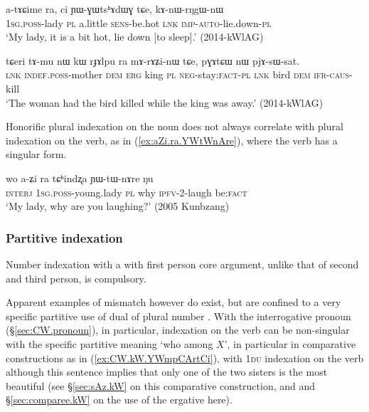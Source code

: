 \begin{exe}
\ex \label{ex:atACime.kAnWrNgWnW}
\gll a-tɤɕime ra, ci ɲɯ-ɣɯtsʰɤdɯɣ tɕe, kɤ-nɯ-rŋgɯ-nɯ \\
\textsc{1sg}.\textsc{poss}-lady \textsc{pl} a.little \textsc{sens}-be.hot \textsc{lnk} \textsc{imp}-\textsc{auto}-lie.down-\textsc{pl} \\
\glt `My lady, it is a bit hot, lie down [to sleep].' (2014-kWlAG)
\end{exe}

\begin{exe}
\ex \label{ex:rJAlpu.mArAZinW}
\gll  tɕeri tɤ-mu nɯ kɯ rɟɤlpu ra mɤ-rɤʑi-nɯ tɕe, pɣɤtɕɯ nɯ pjɤ-sɯ-sat. \\
\textsc{lnk} \textsc{indef}.\textsc{poss}-mother \textsc{dem} \textsc{erg} king \textsc{pl} \textsc{neg}-stay:\textsc{fact}-\textsc{pl} \textsc{lnk} bird \textsc{dem} \textsc{ifr}-\textsc{caus}-kill \\
\glt `The woman had the bird killed while the king was away.' (2014-kWlAG)
\end{exe}

Honorific plural indexation on the noun does not always correlate with plural indexation on the verb, as in (\ref{ex:aZi.ra.YWtWnAre}), where the verb has a singular form.

\begin{exe}
\ex \label{ex:aZi.ra.YWtWnAre}
\gll wo a-ʑi ra tɕʰindʐa ɲɯ-tɯ-nɤre ŋu \\
\textsc{interj} \textsc{1sg}.\textsc{poss}-young.lady \textsc{pl} why \textsc{ipfv}-2-laugh be:\textsc{fact} \\
\glt `My lady, why are you laughing?' (2005 Kunbzang)
\end{exe}



\subsubsection{Partitive indexation} \label{sec:partitive.indexation}
 
Number indexation with a with first person core argument, unlike that of second and third person, is compulsory. 

Apparent examples of mismatch however do exist, but are confined to a very specific partitive use of dual of plural number \citep{bickel00agreement}. With the interrogative pronoun  (§\ref{sec:CW.pronoun}), in particular, indexation on the verb can be non-singular with the specific partitive meaning `who among $X$', in particular in comparative constructions as in (\ref{ex:CW.kW.YWmpCArtCi}), with \textsc{1du} indexation on the verb although this sentence implies that only one of the two sisters is the most beautiful (see §\ref{sec:sAz.kW} on this comparative construction, and \citet{jacques16comparative} and §\ref{sec:comparee.kW} on the use of the ergative here).


